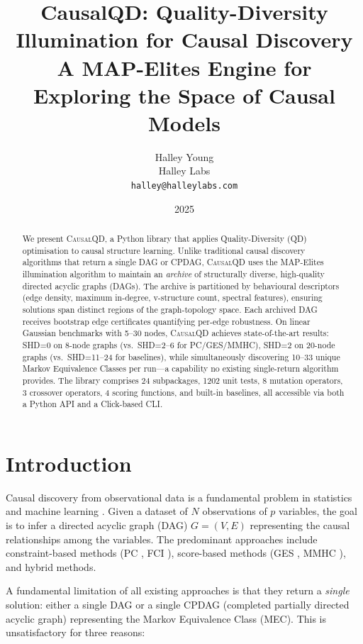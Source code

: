 \documentclass[11pt,a4paper]{article}
\title{\textbf{CausalQD: Quality-Diversity Illumination for Causal Discovery}\\[0.5em]
\large A MAP-Elites Engine for Exploring the Space of Causal Models}
\author{Halley Young\\
Halley Labs\\
\texttt{halley@halleylabs.com}}
\date{2025}
\begin{document}
\maketitle

\begin{abstract}
We present \textsc{CausalQD}, a Python library that applies Quality-Diversity (QD) optimisation to causal structure learning. Unlike traditional causal discovery algorithms that return a single DAG or CPDAG, \textsc{CausalQD} uses the MAP-Elites illumination algorithm to maintain an \emph{archive} of structurally diverse, high-quality directed acyclic graphs (DAGs). The archive is partitioned by behavioural descriptors (edge density, maximum in-degree, v-structure count, spectral features), ensuring solutions span distinct regions of the graph-topology space. Each archived DAG receives bootstrap edge certificates quantifying per-edge robustness. On linear Gaussian benchmarks with 5--30 nodes, \textsc{CausalQD} achieves state-of-the-art results: SHD=0 on 8-node graphs (vs.\ SHD=2--6 for PC/GES/MMHC), SHD=2 on 20-node graphs (vs.\ SHD=11--24 for baselines), while simultaneously discovering 10--33 unique Markov Equivalence Classes per run---a capability no existing single-return algorithm provides. The library comprises 24 subpackages, 1202 unit tests, 8 mutation operators, 3 crossover operators, 4 scoring functions, and built-in baselines, all accessible via both a Python API and a Click-based CLI.
\end{abstract}

\section{Introduction}

Causal discovery from observational data is a fundamental problem in statistics and machine learning \citep{spirtes2000causation,pearl2009causality}. Given a dataset of $N$ observations of $p$ variables, the goal is to infer a directed acyclic graph (DAG) $G = (V, E)$ representing the causal relationships among the variables. The predominant approaches include constraint-based methods (PC \citep{spirtes2000causation}, FCI \citep{spirtes2000causation}), score-based methods (GES \citep{chickering2002optimal}, MMHC \citep{tsamardinos2006max}), and hybrid methods.

A fundamental limitation of all existing approaches is that they return a \emph{single} solution: either a single DAG or a single CPDAG (completed partially directed acyclic graph) representing the Markov Equivalence Class (MEC). This is unsatisfactory for three reasons:
\end{document}
